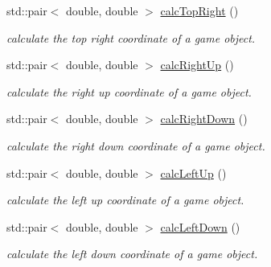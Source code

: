 \begin{DoxyCompactItemize}
std\+::pair$<$ double, double $>$ \hyperlink{classengine_1_1_game_object_a86b57828238be71e962132bb28b7e6b7}{calc\+Top\+Right} ()
\begin{DoxyCompactList}\small\item\em calculate the top right coordinate of a game object. \end{DoxyCompactList}\item 
std\+::pair$<$ double, double $>$ \hyperlink{classengine_1_1_game_object_a40e9d29053f3d9e7ccd5f3cadd007f03}{calc\+Right\+Up} ()
\begin{DoxyCompactList}\small\item\em calculate the right up coordinate of a game object. \end{DoxyCompactList}\item 
std\+::pair$<$ double, double $>$ \hyperlink{classengine_1_1_game_object_a85130378e83e5b0d3cba0b98992c4489}{calc\+Right\+Down} ()
\begin{DoxyCompactList}\small\item\em calculate the right down coordinate of a game object. \end{DoxyCompactList}\item 
std\+::pair$<$ double, double $>$ \hyperlink{classengine_1_1_game_object_aabc735b6bccc2106270ee3e09dca21f9}{calc\+Left\+Up} ()
\begin{DoxyCompactList}\small\item\em calculate the left up coordinate of a game object. \end{DoxyCompactList}\item 
std\+::pair$<$ double, double $>$ \hyperlink{classengine_1_1_game_object_aa3215c1412bd15ad3dcd5bbc6e1e3f94}{calc\+Left\+Down} ()
\begin{DoxyCompactList}\small\item\em calculate the left down coordinate of a game object. \end{DoxyCompactList}\end{DoxyCompactItemize}
